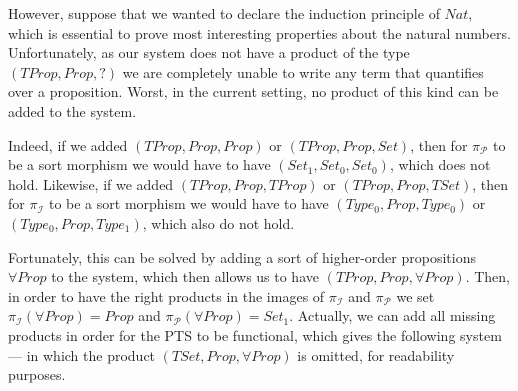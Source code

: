 \documentclass[]{template}
\begin{document}
However, suppose that we wanted to declare the induction principle of $ Nat $, which is essential to prove most interesting properties about the natural numbers. Unfortunately, as our system does not have a product of the type $ (TProp, Prop, ?) $ we are completely unable to write any term that quantifies over a proposition. Worst, in the current setting, no product of this kind can be added to the system.

Indeed, if we added $ (TProp, Prop, Prop) $ or $ (TProp, Prop, Set) $, then for $ \pi_\mathcal{P} $ to be a sort morphism we would have to have $ (Set_1, Set_0, Set_0) $, which does not hold. Likewise, if we added $ (TProp, Prop, TProp) $ or $ (TProp, Prop, TSet) $, then for $ \pi_\mathcal{I} $ to be a sort morphism we would have to have $ (Type_0, Prop, Type_0) $ or $ (Type_0, Prop, Type_1) $, which also do not hold.

Fortunately, this can be solved by adding a sort of higher-order propositions $ \forall Prop $  to the system, which then allows us to have $ (TProp, Prop, \forall Prop) $. Then, in order to have the right products in the images of $ \pi_\mathcal{I} $ and $ \pi_\mathcal{P}  $ we set $ \pi_\mathcal{I}(\forall Prop) = Prop $ and $ \pi_\mathcal{P}(\forall Prop) = Set_1 $. Actually, we can add all missing products in order for the PTS to be functional, which gives the following system --- in which the product $ (TSet, Prop, \forall Prop)  $ is omitted, for readability purposes.

\begin{center}
\end{center}
\end{document}
